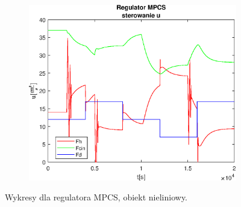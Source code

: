 \begin{figure}[h!]
   \begin{subfigure}[b]{0.4\textwidth}
      \includegraphics[width=1\linewidth]{img/MPCSanaRK/distMPCSRKControlN100Nu10l10.eps}
      \caption{}
      \label{fig:fig:distMPCSRKN100Nu10l103}
   \end{subfigure}
       
   \caption{Wykresy dla regulatora MPCS, obiekt nieliniowy.}
   \label{fig:distMPCSRKN100Nu10l10}
\end{figure}
           

